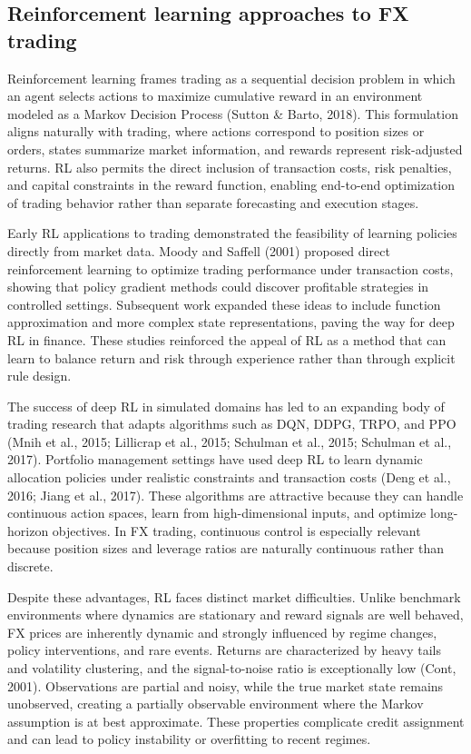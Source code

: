 \documentclass[12pt,a4paper]{article}
\begin{document}
\subsection{Reinforcement learning approaches to FX trading}

Reinforcement learning frames trading as a sequential decision problem in which an agent selects actions to maximize cumulative reward in an environment modeled as a Markov Decision Process (Sutton \& Barto, 2018). This formulation aligns naturally with trading, where actions correspond to position sizes or orders, states summarize market information, and rewards represent risk-adjusted returns. RL also permits the direct inclusion of transaction costs, risk penalties, and capital constraints in the reward function, enabling end-to-end optimization of trading behavior rather than separate forecasting and execution stages.

Early RL applications to trading demonstrated the feasibility of learning policies directly from market data. Moody and Saffell (2001) proposed direct reinforcement learning to optimize trading performance under transaction costs, showing that policy gradient methods could discover profitable strategies in controlled settings. Subsequent work expanded these ideas to include function approximation and more complex state representations, paving the way for deep RL in finance. These studies reinforced the appeal of RL as a method that can learn to balance return and risk through experience rather than through explicit rule design.

The success of deep RL in simulated domains has led to an expanding body of trading research that adapts algorithms such as DQN, DDPG, TRPO, and PPO (Mnih et al., 2015; Lillicrap et al., 2015; Schulman et al., 2015; Schulman et al., 2017). Portfolio management settings have used deep RL to learn dynamic allocation policies under realistic constraints and transaction costs (Deng et al., 2016; Jiang et al., 2017). These algorithms are attractive because they can handle continuous action spaces, learn from high-dimensional inputs, and optimize long-horizon objectives. In FX trading, continuous control is especially relevant because position sizes and leverage ratios are naturally continuous rather than discrete.

Despite these advantages, RL faces distinct market difficulties. Unlike benchmark environments where dynamics are stationary and reward signals are well behaved, FX prices are inherently dynamic and strongly influenced by regime changes, policy interventions, and rare events. Returns are characterized by heavy tails and volatility clustering, and the signal-to-noise ratio is exceptionally low (Cont, 2001). Observations are partial and noisy, while the true market state remains unobserved, creating a partially observable environment where the Markov assumption is at best approximate. These properties complicate credit assignment and can lead to policy instability or overfitting to recent regimes.
\end{document}
